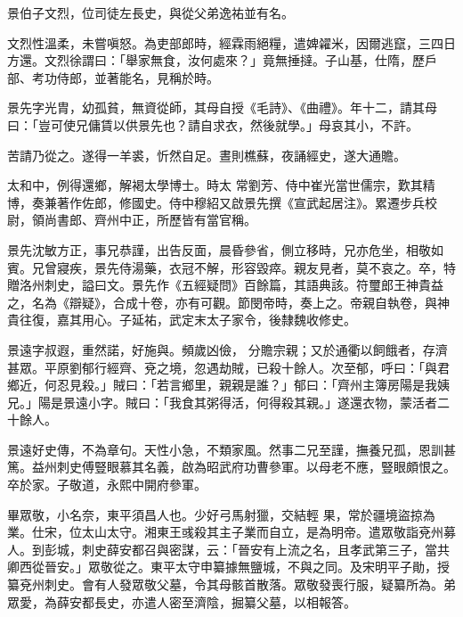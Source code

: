 \begin{pinyinscope}
 景伯子文烈，位司徒左長史，與從父弟逸祐並有名。



 文烈性溫柔，未嘗嗔怒。為吏部郎時，經霖雨絕糧，遣婢糴米，因爾逃竄，三四日方還。文烈徐謂曰：「舉家無食，汝何處來？」竟無捶撻。子山基，仕隋，歷戶部、考功侍郎，並著能名，見稱於時。



 景先字光胄，幼孤貧，無資從師，其母自授《毛詩》、《曲禮》。年十二，請其母曰：「豈可使兄傭賃以供景先也？請自求衣，然後就學。」母哀其小，不許。



 苦請乃從之。遂得一羊裘，忻然自足。晝則樵蘇，夜誦經史，遂大通贍。



 太和中，例得還鄉，解褐太學博士。時太
 常劉芳、侍中崔光當世儒宗，歎其精博，奏兼著作佐郎，修國史。侍中穆紹又啟景先撰《宣武起居注》。累遷步兵校尉，領尚書郎、齊州中正，所歷皆有當官稱。



 景先沈敏方正，事兄恭謹，出告反面，晨昏參省，側立移時，兄亦危坐，相敬如賓。兄曾寢疾，景先侍湯藥，衣冠不解，形容毀瘁。親友見者，莫不哀之。卒，特贈洛州刺史，謚曰文。景先作《五經疑問》百餘篇，其語典該。符璽郎王神貴益之，名為《辯疑》，合成十卷，亦有可觀。節閔帝時，奏上之。帝親自執卷，與神貴往復，嘉其用心。子延祐，武定末太子家令，後隸魏收修史。



 景遠字叔遐，重然諾，好施與。頻歲凶儉，
 分贍宗親；又於通衢以飼餓者，存濟甚眾。平原劉郁行經齊、兗之境，忽遇劫賊，已殺十餘人。次至郁，呼曰：「與君鄉近，何忍見殺。」賊曰：「若言鄉里，親親是誰？」郁曰：「齊州主簿房陽是我姨兄。」陽是景遠小字。賊曰：「我食其粥得活，何得殺其親。」遂還衣物，蒙活者二十餘人。



 景遠好史傳，不為章句。天性小急，不類家風。然事二兄至謹，撫養兄孤，恩訓甚篤。益州刺史傅豎眼慕其名義，啟為昭武府功曹參軍。以母老不應，豎眼頗恨之。卒於家。子敬道，永熙中開府參軍。



 畢眾敬，小名奈，東平須昌人也。少好弓馬射獵，交結輕
 果，常於疆境盜掠為業。仕宋，位太山太守。湘東王彧殺其主子業而自立，是為明帝。遣眾敬詣兗州募人。到彭城，刺史薛安都召與密謀，云：「晉安有上流之名，且孝武第三子，當共卿西從晉安。」眾敬從之。東平太守申纂據無鹽城，不與之同。及宋明平子勛，授纂兗州刺史。會有人發眾敬父墓，令其母骸首散落。眾敬發喪行服，疑纂所為。弟眾愛，為薛安都長史，亦遣人密至濟陰，掘纂父墓，以相報答。




\end{pinyinscope}
